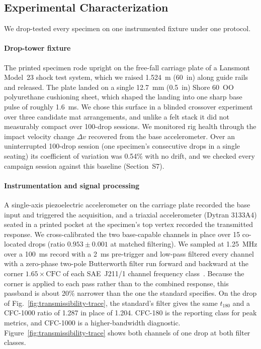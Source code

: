 \documentclass[11pt]{article}
\begin{document}
\subsection{Experimental Characterization}
\label{sec:methods:testing}

We drop-tested every specimen on one instrumented fixture under one
protocol.

\paragraph{Drop-tower fixture} The printed specimen rode upright on the
free-fall carriage plate of a Lansmont Model~23 shock test system, which
we raised \SI{1.524}{m} (\SI{60}{in}) along guide rails and released.
The plate landed on a single \SI{12.7}{mm} (\SI{0.5}{in}) Shore 60~OO polyurethane
cushioning sheet, which shaped the landing into one sharp base pulse of
roughly \SI{1.6}{ms}. We chose this surface in a blinded crossover
experiment over three candidate mat arrangements, and unlike a felt
stack it did not measurably compact over 100-drop sessions. We monitored
rig health through the impact velocity change $\Delta v$ recovered from
the base accelerometer. Over an uninterrupted 100-drop session (one
specimen's consecutive drops in a single seating) its
coefficient of variation was 0.54\% with no drift, and we checked every
campaign session against this baseline (Section~S7).

\paragraph{Instrumentation and signal processing} A single-axis
piezoelectric accelerometer on the carriage plate recorded the base
input and triggered the acquisition, and a triaxial accelerometer
(Dytran 3133A4) seated in a printed pocket at the specimen's top vertex
recorded the transmitted response. We cross-calibrated the two
base-capable channels in place over 15 co-located drops (ratio
$0.953 \pm 0.001$ at matched filtering). We sampled at \SI{1.25}{MHz}
over a \SI{100}{ms} record with a \SI{2}{ms} pre-trigger and low-pass
filtered every channel with a zero-phase two-pole Butterworth filter run
forward and backward at the corner $1.65 \times \mathrm{CFC}$ of each
SAE~J211/1 channel frequency class~\citep{saej211}. Because the corner
is applied to each pass rather than to the combined response, this
passband is about 20\% narrower than the one the standard specifies. On
the drop of Fig.~\ref{fig:transmissibility-trace}, the standard's
filter gives the same $t_{180}$ and a CFC-1000 ratio of 1.287 in place of
1.204. CFC-180 is the reporting class for peak metrics, and
CFC-1000 is a higher-bandwidth diagnostic.
Figure~\ref{fig:transmissibility-trace} shows both channels of one drop
at both filter classes.
\end{document}
